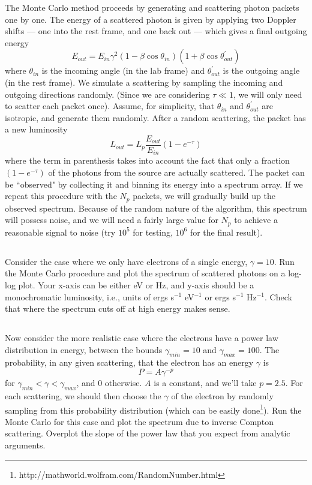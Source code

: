 \documentclass[11pt]{article}
\begin{document}
The Monte Carlo method proceeds by generating and scattering photon packets one
by one. The energy of a scattered photon is given by applying two Doppler
shifts --- one into the rest frame, and one back out --- which gives a final
outgoing energy
\begin{equation}
E_{out}=E_{in}\gamma^2(1-\beta\cos\theta_{in})(1+\beta\cos\theta^\prime_{out})
\end{equation}
where $\theta_{in}$ is the incoming angle (in the lab frame) and
$\theta^\prime_{out}$ is the outgoing angle (in the rest frame).  We simulate
a scattering by sampling the incoming and outgoing directions randomly. (Since
we are considering $\tau\ll1$, we will only need to scatter each packet once).
Assume, for simplicity, that $\theta_{in}$ and $\theta^\prime_{out}$ are isotropic,
and generate them randomly.  After a random scattering, the packet has a new luminosity
\begin{equation}
L_{out} = L_p\frac{E_{out}}{E_{in}}(1-e^{-\tau})
\end{equation}
where the term in parenthesis takes into account the fact that only a fraction
$(1-e^{-\tau})$ of the photons from the source are actually scattered.
The packet can be ``observed" by collecting it and binning
its energy into a spectrum array. If we repeat this procedure with 
the $N_p$ packets, we will gradually build up the observed spectrum. 
Because of the random nature of the algorithm, this spectrum will 
possess noise, and we will need a fairly large value for 
$N_p$ to achieve a reasonable signal to noise (try $10^5$ for testing,
$10^6$ for the final result).

\subsection{}
Consider the case where we only have electrons of a single energy, $\gamma=10$. Run
the Monte Carlo procedure and plot the spectrum of scattered photons on a
log-log plot. Your x-axis can be either eV or Hz, and y-axis should be a
monochromatic luminosity, i.e., units of ergs s$^{-1}$ eV$^{-1}$ or ergs s$^{-1}$ Hz$^{-1}$. 
Check that where the spectrum cuts off at
high energy makes sense.

\subsection{}
Now consider the more realistic case where the electrons have a power law distribution in energy, between the bounds
$\gamma_{min}=10$ and $\gamma_{max}=100$.  The probability, in any given scattering, that the
electron has an energy $\gamma$ is
\begin{equation}
P=A\gamma^{-p}
\end{equation}
for $\gamma_{min}<\gamma<\gamma_{max}$, and 0 otherwise.  $A$ is a constant, and we'll take
$p=2.5$.  For each scattering, we should then choose the $\gamma$ of the electron 
by randomly sampling from this probability distribution (which can be easily
done\footnote{http://mathworld.wolfram.com/RandomNumber.html}). Run 
the Monte Carlo for this case and plot the spectrum due to inverse
Compton scattering. 
Overplot the slope of the power law that you expect from analytic
arguments.
\end{document}
